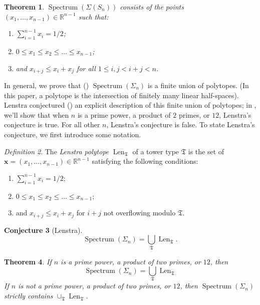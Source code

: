 \documentclass[letterpaper,10pt]{amsart}
\DeclareMathOperator{\Len}{Len}
\DeclareMathOperator{\Spe}{Spectrum}
\newcommand{\RR}{\mathbb{R}}      %
\newcommand{\mfT}{\mathfrak{T}}
\newtheorem{theorem}{Theorem}[section]
\theoremstyle{definition}
\newtheorem{conjecture}[theorem]{Conjecture}
\theoremstyle{remark}
\newtheorem{definition}[theorem]{Definition}
\begin{document}
\begin{theorem}
\label{thm:sn-spectrum}
$\Spe(\Sigma(S_n))$ consists of the points $(x_1,\dots,x_{n-1}) \in \RR^{n-1}$ such that:
\begin{enumerate}
    \item $\sum_{i = 1}^{n-1}x_i = 1/2$;
    \item $0 \leq x_1 \leq x_2 \leq \dots \leq x_{n-1}$;
    \item and $x_{i+j} \leq x_i + x_j$ for all $1 \leq i,j < i+j < n$.
\end{enumerate}
\end{theorem}

In general, we prove that () $\Spe(\Sigma_n)$ is a finite union of polytopes. (In this paper, a polytope is the intersection of finitely many linear half-spaces). Lenstra conjectured () an explicit description of this finite union of polytopes; in , we'll show that when $n$ is a prime power, a product of $2$ primes, or $12$, Lenstra's conjecture is true. For all other $n$, Lenstra's conjecture is false. To state Lenstra's conjecture, we first introduce some notation.

\begin{definition}
\label{def:lenstra-polytope}
The \emph{Lenstra polytope} $\Len_{\mfT}$ of a tower type $\mfT$ is the set of $\mathbf{x} = (x_1,\dots,x_{n-1}) \in \RR^{n-1}$ satisfying the following conditions:
\begin{enumerate}
\item $\sum_{i = 1}^{n-1}x_i = 1/2$;
\item $0 \leq x_1 \leq x_2 \leq \dots \leq x_{n-1}$;
\item and $x_{i+j} \leq x_i + x_j$ for $i+j$ not overflowing modulo $\mfT$.
\end{enumerate}
\end{definition}

\begin{conjecture}[Lenstra]
\label{conj:lenstra}
\[
	 \Spe(\Sigma_n) = \bigcup_{\mfT} \Len_{\mfT}.
\]
\end{conjecture}

\begin{theorem}
\label{thm:lenstra-spectrum}
If $n$ is a prime power, a product of two primes, or $12$, then
\[
    \Spe(\Sigma_n) = \bigcup_{\mfT} \Len_{\mfT}
\]
If $n$ is not a prime power, a product of two primes, or $12$, then $\Spe(\Sigma_n)$ strictly contains $\cup_{\mfT} \Len_{\mfT}$.
\end{theorem}
\end{document}
